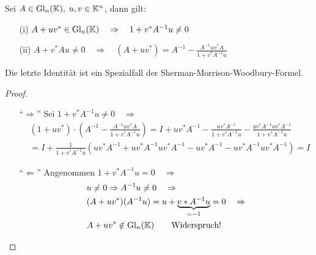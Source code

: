 \begin{Lemma}
Sei $A \in \mathrm{Gl}_n(\mathbb K), \; u, v \in \mathbb K^n$, dann gilt:
  \begin{enumerate}
    \item[(i)] $A + u  v^* \in \mathrm{Gl}_n(\mathbb K) \quad \Rightarrow \quad 1 + v^* A^{-1} u \ne 0$
    \item[(ii)] $A + v^* A u \ne 0  \quad \Rightarrow \quad
      (A + uv^*) = A^{-1} - \frac{A^{-1} u v^* A}{1 + v^*A^{-1}u}$
  \end{enumerate}
Die letzte Identität ist ein Spezialfall der Sherman-Morrison-Woodbury-Formel.
\end{Lemma}
\begin{proof}
\quad \\
  \begin{enumerate}
    \item["`$\Rightarrow$"'] Sei $1 + v^* A^{-1} u \ne 0 \quad \Rightarrow $
    \begin{align*}
    & (1 + u v^*)\cdot \left(A^{-1} - \frac{A^{-1} u v^* A}{1 + v^*A^{-1}u}  \right) =
    I + u v^*A^{-1} - \frac{u v^* A^{-1}}{1 + v^*A^{-1} u} -
       \frac{u v^* A^{-1}u v^* A^{-1}}{1 +  v^*A^{-1} u} \\
    & = I + \frac{1}{1 + v^*A^{-1}u} \left( u v^* A^{-1} + u v^* A^{-1} u v^* A^{-1} -
      u v^* A^{-1} - u v^* A^{-1} u v^* A^{-1} \right) = I
    \end{align*}

    \item["`$\Leftarrow$"'] Angenommen $1 + v^* A^{-1} u = 0 \quad \Rightarrow $
    \begin{align*}
      & u \ne 0 \Rightarrow A^{-1} u \ne 0 \quad \Rightarrow \\
      & (A + u v^*) (A^{-1} u) = u + \underbrace{v* A^{-1} u}_{= -1} = 0 \quad \Rightarrow \\
     &  A + u v^* \notin \mathrm{Gl}_n(\mathbb K) \qquad \text{Widerspruch!}
    \end{align*}
  \end{enumerate}
\end{proof}
